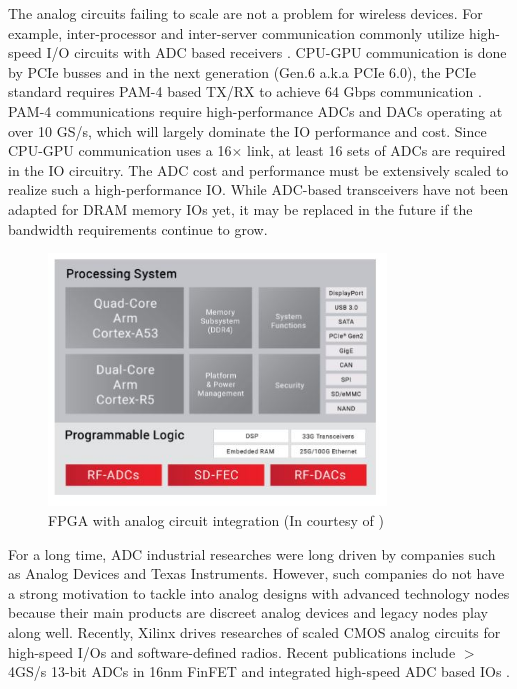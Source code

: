 The analog circuits failing to scale are not a problem for wireless devices. For example, inter-processor and inter-server communication commonly utilize high-speed I/O circuits with ADC based receivers \cite{wireline} \cite{wireline2}.
CPU-GPU communication is done by PCIe busses and in the next generation (Gen.6 a.k.a PCIe 6.0), the PCIe standard requires PAM-4 based TX/RX to achieve 64 Gbps communication \cite{PCIe}.
PAM-4 communications require high-performance ADCs and DACs operating at over 10 GS/s, which will largely dominate the IO performance and cost. Since CPU-GPU communication uses a 16$\times$ link, at least 16 sets of ADCs are required in the IO circuitry. The ADC cost and performance must be extensively scaled to realize such a high-performance IO.
While ADC-based transceivers have not been adapted for DRAM memory IOs yet, it may be replaced in the future if the bandwidth requirements continue to grow.


\begin{figure}[!]
\centering
  \includegraphics[width=0.8\textwidth]{figure/chap1/fpga.JPG}
  \caption{FPGA with analog circuit integration (In courtesy of \cite{fpga})}
  \label{FPGA}
\end{figure}

For a long time, ADC industrial researches were long driven by companies such as Analog Devices and Texas Instruments. However, such companies do not have a strong motivation to tackle into analog designs with advanced technology nodes because their main products are discreet analog devices and legacy nodes play along well.
Recently, Xilinx drives researches of scaled CMOS analog circuits for high-speed I/Os and software-defined radios. Recent publications include $>$ 4GS/s 13-bit ADCs in 16nm FinFET \cite{xilinxadc} \cite{xilinxadc2} and integrated high-speed ADC based IOs \cite{xilinxwireline}.

